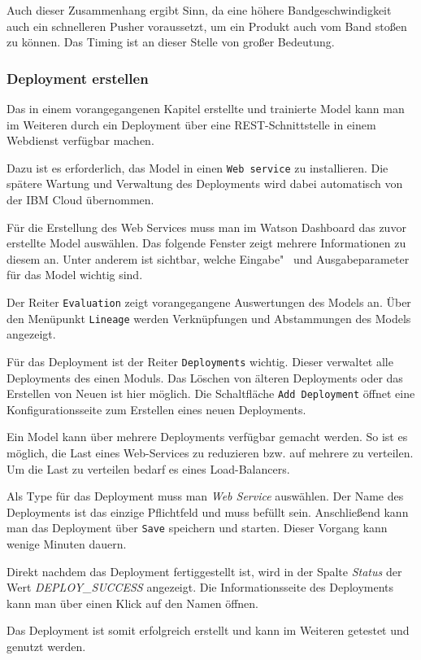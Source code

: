 Auch dieser Zusammenhang ergibt Sinn, da eine höhere Bandgeschwindigkeit auch ein schnelleren Pusher voraussetzt, um ein
Produkt auch vom Band stoßen zu können. Das Timing ist an dieser Stelle von großer Bedeutung.

\subsubsection{Deployment erstellen}
Das in einem vorangegangenen Kapitel erstellte und trainierte Model kann man im Weiteren durch ein Deployment über eine
REST-Schnittstelle in einem Webdienst verfügbar machen.

Dazu ist es erforderlich, das Model in einen \texttt{Web service} zu installieren. Die spätere Wartung und Verwaltung
des Deployments wird dabei automatisch von der IBM Cloud übernommen.

Für die Erstellung des Web Services muss man im Watson Dashboard das zuvor erstellte Model auswählen. Das folgende
Fenster zeigt mehrere Informationen zu diesem an. Unter anderem ist sichtbar, welche Eingabe"~ und Ausgabeparameter für
das Model wichtig sind.

Der Reiter \texttt{Evaluation} zeigt vorangegangene Auswertungen des Models an. Über den Menüpunkt \texttt{Lineage}
werden Verknüpfungen und Abstammungen des Models angezeigt.

Für das Deployment ist der Reiter \texttt{Deployments} wichtig. Dieser verwaltet alle Deployments des einen Moduls. Das
Löschen von älteren Deployments oder das Erstellen von Neuen ist hier möglich. Die Schaltfläche \texttt{Add Deployment}
öffnet eine Konfigurationsseite zum Erstellen eines neuen Deployments.

Ein Model kann über mehrere Deployments verfügbar gemacht werden. So ist es möglich, die Last eines Web-Services zu
reduzieren bzw. auf mehrere zu verteilen. Um die Last zu verteilen bedarf es eines Load-Balancers.

Als Type für das Deployment muss man \textit{Web Service} auswählen. Der Name des Deployments ist das einzige Pflichtfeld
und muss befüllt sein. Anschließend kann man das Deployment über \texttt{Save} speichern und starten. Dieser Vorgang kann
wenige Minuten dauern.

Direkt nachdem das Deployment fertiggestellt ist, wird in der Spalte \textit{Status} der Wert \textit{DEPLOY\_SUCCESS}
angezeigt. Die Informationsseite des Deployments kann man über einen Klick auf den Namen öffnen.

Das Deployment ist somit erfolgreich erstellt und kann im Weiteren getestet und genutzt werden.

